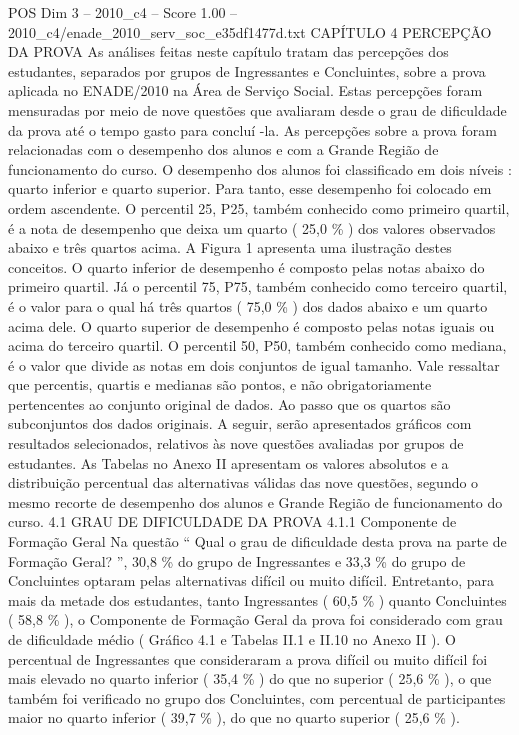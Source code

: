 \begin{textsample}{POS Dim 3 – 2010\_c4 – Score 1.00 – 2010\_c4/enade\_2010\_serv\_soc\_e35df1477d.txt}  \label{ex:f3_pos_150}
CAPÍTULO 4 PERCEPÇÃO DA PROVA As análises feitas neste capítulo tratam das percepções dos estudantes, separados por grupos de Ingressantes e Concluintes, sobre a prova aplicada no ENADE/2010 na Área de Serviço Social.
Estas percepções foram mensuradas por meio de nove questões que avaliaram desde o grau de dificuldade da prova até o tempo gasto para concluí -la.
As percepções sobre a prova foram relacionadas com o desempenho dos alunos e com a Grande Região de funcionamento do curso.
O desempenho dos alunos foi classificado em dois níveis : quarto inferior e quarto superior.
Para tanto, esse desempenho foi colocado em ordem ascendente.
O percentil 25, P25, também conhecido como primeiro quartil, é a nota de desempenho que deixa um quarto ( 25,0 \% ) dos valores observados abaixo e três quartos acima.
A Figura 1 apresenta uma ilustração destes conceitos.
O quarto inferior de desempenho é composto pelas notas abaixo do primeiro quartil.
Já o percentil 75, P75, também conhecido como terceiro quartil, é o valor para o qual há três quartos ( 75,0 \% ) dos dados abaixo e um quarto acima dele.
O quarto superior de desempenho é composto pelas notas iguais ou acima do terceiro quartil.
O percentil 50, P50, também conhecido como mediana, é o valor que divide as notas em dois conjuntos de igual tamanho.
Vale ressaltar que percentis, quartis e medianas são pontos, e não obrigatoriamente pertencentes ao conjunto original de dados.
Ao passo que os quartos são subconjuntos dos dados originais.
A seguir, serão apresentados gráficos com resultados selecionados, relativos às nove questões avaliadas por grupos de estudantes.
As Tabelas no Anexo II apresentam os valores absolutos e a distribuição percentual das alternativas válidas das nove questões, segundo o mesmo recorte de desempenho dos alunos e Grande Região de funcionamento do curso. 4.1 GRAU DE DIFICULDADE DA PROVA 4.1.1 Componente de Formação Geral Na questão “ Qual o grau de dificuldade desta prova na parte de Formação Geral? ”, 30,8 \% do grupo de Ingressantes e 33,3 \% do grupo de Concluintes optaram pelas alternativas difícil ou muito difícil.
Entretanto, para mais da metade dos estudantes, tanto Ingressantes ( 60,5 \% ) quanto Concluintes ( 58,8 \% ), o Componente de Formação Geral da prova foi considerado com grau de dificuldade médio ( Gráfico 4.1 e Tabelas II.1 e II.10 no Anexo II ).
O percentual de Ingressantes que consideraram a prova difícil ou muito difícil foi mais elevado no quarto inferior ( 35,4 \% ) do que no superior ( 25,6 \% ), o que também foi verificado no grupo dos Concluintes, com percentual de participantes maior no quarto inferior ( 39,7 \% ), do que no quarto superior ( 25,6 \% ).

\end{textsample}
